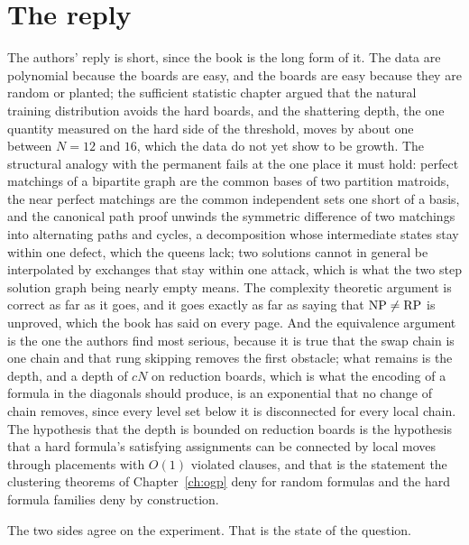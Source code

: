 \section{The reply}

The authors' reply is short, since the book is the long form of it. The data are polynomial because the boards are easy, and the boards are easy because they are random or planted; the sufficient statistic chapter argued that the natural training distribution avoids the hard boards, and the shattering depth, the one quantity measured on the hard side of the threshold, moves by about one between $N = 12$ and $16$, which the data do not yet show to be growth. The structural analogy with the permanent fails at the one place it must hold: perfect matchings of a bipartite graph are the common bases of two partition matroids, the near perfect matchings are the common independent sets one short of a basis, and the canonical path proof unwinds the symmetric difference of two matchings into alternating paths and cycles, a decomposition whose intermediate states stay within one defect, which the queens lack; two solutions cannot in general be interpolated by exchanges that stay within one attack, which is what the two step solution graph being nearly empty means. The complexity theoretic argument is correct as far as it goes, and it goes exactly as far as saying that $\mathrm{NP} \ne \mathrm{RP}$ is unproved, which the book has said on every page. And the equivalence argument is the one the authors find most serious, because it is true that the swap chain is one chain and that rung skipping removes the first obstacle; what remains is the depth, and a depth of $cN$ on reduction boards, which is what the encoding of a formula in the diagonals should produce, is an exponential that no change of chain removes, since every level set below it is disconnected for every local chain. The hypothesis that the depth is bounded on reduction boards is the hypothesis that a hard formula's satisfying assignments can be connected by local moves through placements with $O(1)$ violated clauses, and that is the statement the clustering theorems of Chapter~\ref{ch:ogp} deny for random formulas and the hard formula families deny by construction.

The two sides agree on the experiment. That is the state of the question.
